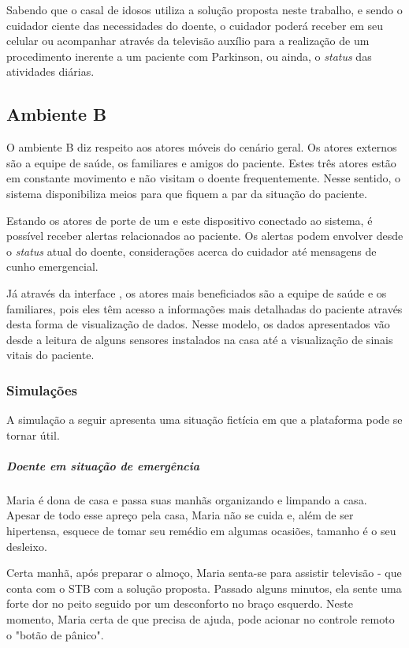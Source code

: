 Sabendo que o casal de idosos utiliza a solução proposta neste trabalho, e sendo o
cuidador ciente das necessidades do doente, o cuidador poderá receber em seu celular ou
acompanhar através da televisão auxílio para a realização de um procedimento inerente
a um paciente com Parkinson, ou ainda, o \textit{status} das atividades diárias.

\subsection{Ambiente B} \label{subsec:ambiente-b}

O ambiente B diz respeito aos atores móveis do cenário geral. Os atores externos
são a equipe de saúde, os familiares e amigos do paciente. Estes três atores
estão em constante movimento e não visitam o doente frequentemente. Nesse
sentido, o sistema disponibiliza meios para que fiquem a par da situação do
paciente.

Estando os atores de porte de um \smartphone[] e este dispositivo conectado ao
sistema, é possível receber alertas relacionados ao paciente. Os alertas podem
envolver desde o \textit{status} atual do doente, considerações acerca do
cuidador até mensagens de cunho emergencial.

Já através da interface \web[], os atores mais beneficiados são a equipe de
saúde e os familiares, pois eles têm acesso a informações mais detalhadas do
paciente através desta forma de visualização de dados. Nesse modelo, os dados
apresentados vão desde a leitura de alguns sensores instalados na casa até a
visualização de sinais vitais do paciente.

\subsubsection{Simulações}

A simulação a seguir apresenta uma situação fictícia em que a plataforma pode
se tornar útil.

\subparagraph{Doente em situação de emergência}

Maria é dona de casa e passa suas manhãs organizando e limpando a casa. Apesar
de todo esse apreço pela casa, Maria não se cuida e, além de ser hipertensa,
esquece de tomar seu remédio em algumas ocasiões, tamanho é o seu desleixo.

Certa manhã, após preparar o almoço, Maria senta-se para assistir televisão -
que conta com o STB com a solução proposta. Passado alguns minutos, ela sente
uma forte dor no peito seguido por um desconforto no braço esquerdo. Neste
momento, Maria certa de que precisa de ajuda, pode acionar no controle remoto o
"botão de pânico". 

